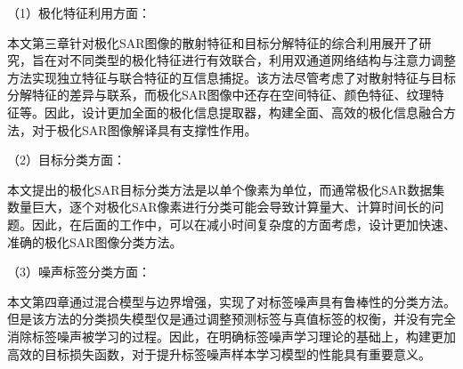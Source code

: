 （1）极化特征利用方面：

本文第三章针对极化SAR图像的散射特征和目标分解特征的综合利用展开了研究，旨在对不同类型的极化特征进行有效联合，利用双通道网络结构与注意力调整方法实现独立特征与联合特征的互信息捕捉。该方法尽管考虑了对散射特征与目标分解特征的差异与联系，而极化SAR图像中还存在空间特征、颜色特征、纹理特征等。因此，设计更加全面的极化信息提取器，构建全面、高效的极化信息融合方法，对于极化SAR图像解译具有支撑性作用。

（2）目标分类方面：

本文提出的极化SAR目标分类方法是以单个像素为单位，而通常极化SAR数据集数量巨大，逐个对极化SAR像素进行分类可能会导致计算量大、计算时间长的问题。因此，在后面的工作中，可以在减小时间复杂度的方面考虑，设计更加快速、准确的极化SAR图像分类方法。

（3）噪声标签分类方面：

本文第四章通过混合模型与边界增强，实现了对标签噪声具有鲁棒性的分类方法。但是该方法的分类损失模型仅是通过调整预测标签与真值标签的权衡，并没有完全消除标签噪声被学习的过程。因此，在明确标签噪声学习理论的基础上，构建更加高效的目标损失函数，对于提升标签噪声样本学习模型的性能具有重要意义。


